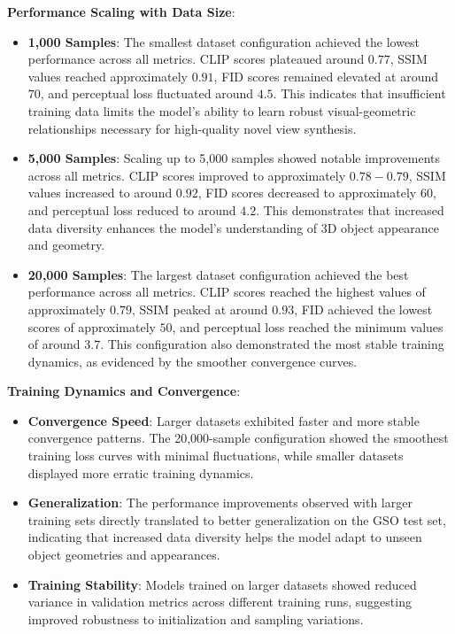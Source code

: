 \textbf{Performance Scaling with Data Size}:
\begin{itemize}
  \item \textbf{1,000 Samples}: The smallest dataset configuration achieved the lowest performance across all metrics. CLIP scores plateaued around $0.77$, SSIM values reached approximately $0.91$, FID scores remained elevated at around $70$, and perceptual loss fluctuated around $4.5$. This indicates that insufficient training data limits the model's ability to learn robust visual-geometric relationships necessary for high-quality novel view synthesis.

  \item \textbf{5,000 Samples}: Scaling up to 5,000 samples showed notable improvements across all metrics. CLIP scores improved to approximately $0.78-0.79$, SSIM values increased to around $0.92$, FID scores decreased to approximately $60$, and perceptual loss reduced to around $4.2$. This demonstrates that increased data diversity enhances the model's understanding of 3D object appearance and geometry.

  \item \textbf{20,000 Samples}: The largest dataset configuration achieved the best performance across all metrics. CLIP scores reached the highest values of approximately $0.79$, SSIM peaked at around $0.93$, FID achieved the lowest scores of approximately $50$, and perceptual loss reached the minimum values of around $3.7$. This configuration also demonstrated the most stable training dynamics, as evidenced by the smoother convergence curves.
\end{itemize}

\textbf{Training Dynamics and Convergence}:
\begin{itemize}
  \item \textbf{Convergence Speed}: Larger datasets exhibited faster and more stable convergence patterns. The 20,000-sample configuration showed the smoothest training loss curves with minimal fluctuations, while smaller datasets displayed more erratic training dynamics.
  \item \textbf{Generalization}: The performance improvements observed with larger training sets directly translated to better generalization on the GSO test set, indicating that increased data diversity helps the model adapt to unseen object geometries and appearances.
  \item \textbf{Training Stability}: Models trained on larger datasets showed reduced variance in validation metrics across different training runs, suggesting improved robustness to initialization and sampling variations.
\end{itemize}

